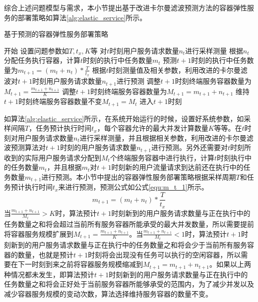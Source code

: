 综合上述问题模型与需求，本小节提出基于改进卡尔曼滤波预测方法的容器弹性服务的部署策略如算法\ref{alg:elastic_service}所示。

\begin{algorithm}
    \caption{基于预测的容器弹性服务部署策略}
    \label{alg:elastic_service}
    
    \begin{algorithmic}[1]
    \State  开始
    \State  设置问题参数如$T,t_x,K$等
        \State 对$t$时刻用户服务请求数量$n_t$进行采样测量
        \State 根据$n_t$分配任务执行容器，计算$t$时刻的执行中任务数量$m_t$%
        \State 预测$t+1$时刻的执行中任务数量为$m_{t+1}=(m_t+n_t)*\frac{T}{t_x}$
        \State 根据$t$时刻测量值及相关参数，利用改进的卡尔曼滤波对$t+1$时刻用户服务请求数量$n_{t+1}$进行预测
            \State 调整$t+1$时刻终端服务容器数量为$M_{t+1}=\frac{m_{t+1}+n_{t+1}}{K}$
        \Else
                \State 调整$t+1$时刻终端服务容器数量为$M_{t+1}=m_{t+1}+n_{t+1}$
            \Else
                \State 维持$t+1$时刻终端服务容器数量不变$M_{t+1}=M_{t}$
            \EndIf
        \EndIf
        \State 进入$t+1$时刻
    \EndWhile
    
    \end{algorithmic}
    
\end{algorithm}

如算法\ref{alg:elastic_service}所示，在系统开始运行的时候，设置好系统参数，如采样间隔$T$，任务预计执行时间$t_x$，每个容器允许的最大并发计算数量$K$等等。在$t$时刻对用户服务请求数量$n_t$进行采样测量，并且根据相关参数，利用改进的卡尔曼滤波预测算法对$t+1$时刻的用户服务请求数量$n_{t+1}$进行预测。另外还需要对$t$时刻所收到的实际用户服务请求分配到$M_t$个终端服务容器中进行执行，计算$t$时刻执行中的任务数量$m_t$，并且根据$m_t$对$t+1$时刻新的用户流量请求到达前还在执行中的任务数量$m_{t+1}$进行预测。本小节中提出的容器弹性服务部署策略根据采样周期$T$和任务预计执行时间$t_x$来进行预测，预测公式如公式\ref{equ:m_t_1}所示。
\begin{equation}\label{equ:m_t_1}
    m_{t+1}=(m_t+n_t)*\frac{T}{t_x}
\end{equation}
当$\frac{m_{t+1}+n_{t+1}}{M_t}>K$时，算法预计$t+1$时刻新到的用户服务请求数量与正在执行中的任务数量之和将会超过当前所有服务容器所能承受的最大并发数量，所以需要提前将容器服务规模扩展到$M_{t+1}=\frac{m_{t+1}+n_{t+1}}{K}$。当$\frac{m_{t+1}+n_{t+1}}{M_t}<1$时，算法预计$t+1$时刻新到的用户服务请求数量与正在执行中的任务数量之和将会少于当前所有服务容器的数量，也就是预计$t+1$时刻将会出现没有任务可以执行的空闲容器，所以需要在下一时刻到来之前将容器服务规模缩减到$M_{t+1}=m_{t+1}+n_{t+1}$。如果以上两种情况都未发生，即算法预计$t+1$时刻新到的用户服务请求数量与正在执行中的任务数量之和将会正好处于当前服务容器所能够承受的范围内，为了减少并发以及减少容器服务规模的变动次数，算法选择维持服务容器的数量不变。

